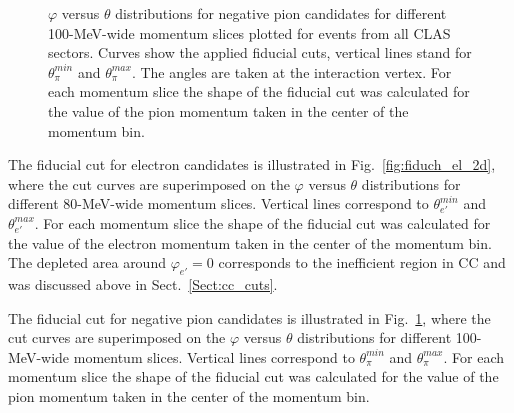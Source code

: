 \begin{figure}[htp]
\begin{center}
\caption{\small $\varphi$ versus $\theta$ distributions for negative pion candidates for different 100-MeV-wide momentum slices plotted for events from all CLAS sectors. Curves show the applied fiducial cuts, vertical lines stand for $\theta_{\pi}^{min}$ and $\theta_{\pi}^{max}$. The angles are taken at the interaction vertex. For each momentum slice the shape of the fiducial cut was calculated for the value of the pion momentum taken in the center of the momentum bin. \label{fig:fiduch_pim_2d}}
\end{center}
\end{figure}


The fiducial cut for electron candidates is illustrated in Fig.~\ref{fig:fiduch_el_2d}, where the cut curves are superimposed on the $\varphi$ versus $\theta$ distributions for different 80-MeV-wide momentum slices. Vertical lines correspond to $\theta_{e'}^{min}$ and $\theta_{e'}^{max}$. For each momentum slice the shape of the fiducial cut was calculated for the value of the electron momentum taken in the center of the momentum bin. The depleted area around $\varphi_{e'} = 0$ corresponds to the inefficient region in CC and was discussed above in Sect.~\ref{Sect:cc_cuts}.  

The fiducial cut for negative pion candidates is illustrated in Fig.~\ref{fig:fiduch_pim_2d}, where the cut curves are superimposed on the $\varphi$ versus $\theta$ distributions for different 100-MeV-wide momentum slices. Vertical lines correspond to $\theta_{\pi}^{min}$ and $\theta_{\pi}^{max}$. For each momentum slice the shape of the fiducial cut was calculated for the value of the pion momentum taken in the center of the momentum bin.

